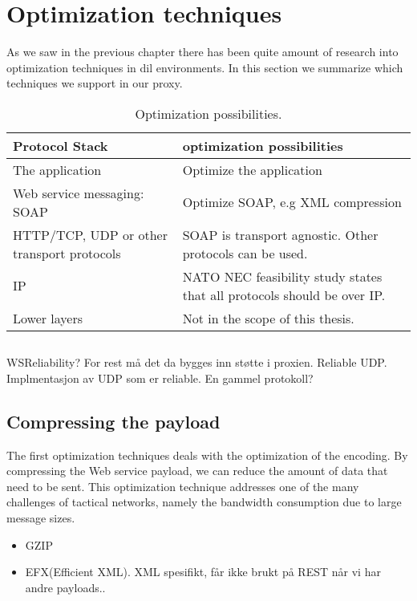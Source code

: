 \section{Optimization techniques}

As we saw in the previous chapter there has been quite amount of research into
optimization techniques in \gls{dil} environments. In this section we summarize
which techniques we support in our proxy.


\begin{table}[h]
\begin{tabularx}{\textwidth}{| X | X |}
\hline
  \textbf{Protocol Stack} & \textbf{optimization possibilities} \\ \hline
  The application & Optimize the application\\ \hline
  Web service messaging: SOAP & Optimize SOAP, e.g XML compression \\ \hline
  HTTP/TCP, UDP or other transport protocols & SOAP is transport agnostic. Other
  protocols can be used. \\ \hline
  IP & NATO NEC feasibility study states that all protocols should be over IP. \\
  \hline
  Lower layers & Not in the scope of this thesis. \\ \hline
\end{tabularx}
\caption{Optimization possibilities.} \label{table:optimalization-overview}
\end{table}

\subsection{}
WSReliability? For rest må det da bygges inn støtte i proxien.
Reliable UDP. Implmentasjon av UDP som er reliable. En gammel protokoll?


\subsection{Compressing the payload}

The first optimization techniques deals with the optimization of the encoding.
By compressing the Web service payload, we can reduce the amount of data that
need to be sent. This optimization technique addresses one of the many
challenges of tactical networks, namely the bandwidth consumption due to large
message sizes.

\begin{itemize}
\item GZIP

\item EFX(Efficient XML). XML spesifikt, får ikke brukt på REST når vi har andre
payloads..

\end{itemize}

